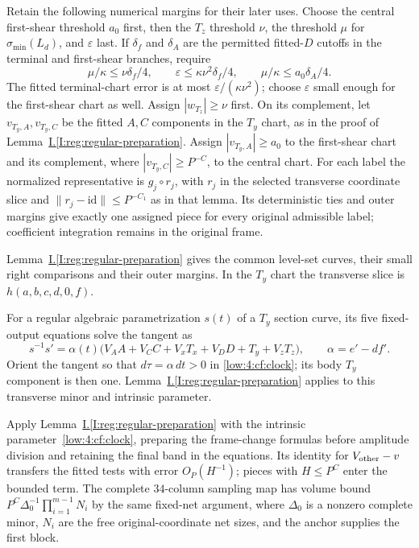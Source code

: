 \documentclass[11pt]{amsart}
\theoremstyle{definition}
\theoremstyle{remark}
\numberwithin{equation}{section}
\newcommand{\partIref}[1]{\hyperref[I:#1]{I.\ref*{I:#1}}}
\begin{document}
Retain the following numerical margins for their later uses. Choose the central first-shear threshold $a_0$ first, then the $T_z$ threshold $\nu$, the threshold $\mu$ for $\sigma_{\min}(L_d)$, and $\varepsilon$ last. If $\delta_f$ and $\delta_A$ are the permitted fitted-$D$ cutoffs in the terminal and first-shear branches, require
\[
 \mu/\kappa\le\nu\delta_f/4,\qquad \varepsilon\le\kappa\nu^2\delta_f/4,\qquad \mu/\kappa\le a_0\delta_A/4.
\]
The fitted terminal-chart error is at most $\varepsilon/(\kappa\nu^2)$; choose $\varepsilon$ small enough for the first-shear chart as well. Assign $|w_{T_z}|\ge\nu$ first. On its complement, let $v_{T_y,A},v_{T_y,C}$ be the fitted $A,C$ components in the $T_y$ chart, as in the proof of Lemma~\partIref{reg:regular-preparation}. Assign $|v_{T_y,A}|\ge a_0$ to the first-shear chart and its complement, where $|v_{T_y,C}|\ge P^{-C}$, to the central chart. For each label the normalized representative is $g_j\circ r_j$, with $r_j$ in the selected transverse coordinate slice and $\|r_j-\mathrm{id}\|\le P^{-C_1}$ as in that lemma. Its deterministic ties and outer margins give exactly one assigned piece for every original admissible label; coefficient integration remains in the original frame.

Lemma~\partIref{reg:regular-preparation} gives the common level-set curves, their small right comparisons and their outer margins. In the $T_y$ chart the transverse slice is $h(a,b,c,d,0,f)$.

For a regular algebraic parametrization $s(t)$ of a $T_y$ section curve, its five fixed-output equations solve the tangent as
\begin{equation}\label{low:4:cf:clock}
s^{-1}s'=\alpha(t)\big(V_A A+V_C C+V_xT_x+V_DD+T_y+V_zT_z\big),
\qquad \alpha=e'-d f'.
\end{equation}
Orient the tangent so that $d\tau=\alpha\,dt>0$ in \eqref{low:4:cf:clock}; its body $T_y$ component is then one. Lemma~\partIref{reg:regular-preparation} applies to this transverse minor and intrinsic parameter.

Apply Lemma~\partIref{reg:regular-preparation} with the intrinsic parameter~\eqref{low:4:cf:clock}, preparing the frame-change formulas before amplitude division and retaining the final band in the equations. Its identity for $V_{\rm other}-v$ transfers the fitted tests with error $O_P(H^{-1})$; pieces with $H\le P^C$ enter the bounded term. The complete $34$-column sampling map has volume bound $P^C\Delta_0^{-1}\prod_{i=1}^{m-1}N_i$ by the same fixed-net argument, where $\Delta_0$ is a nonzero complete minor, $N_i$ are the free original-coordinate net sizes, and the anchor supplies the first block.
\end{document}
